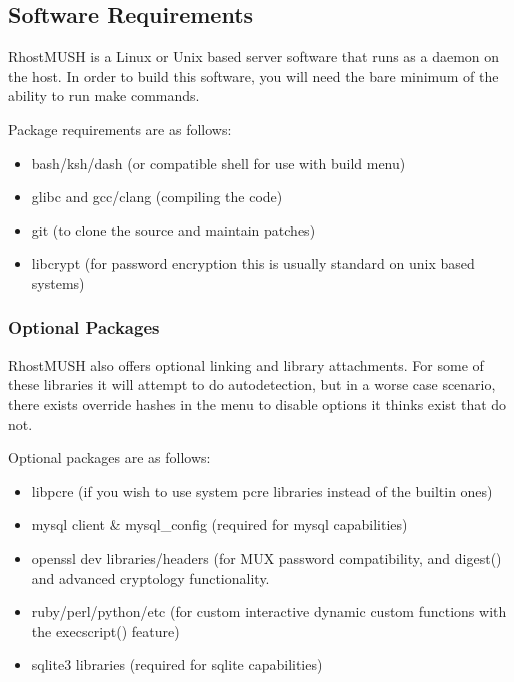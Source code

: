 \documentclass[letterpaper,10pt,english]{sphinxmanual}
\begin{document}
\subsection{Software Requirements}
\label{\detokenize{install:software-requirements}}\label{\detokenize{install:id4}}
\sphinxAtStartPar
RhostMUSH is a Linux or Unix based server software that runs as a daemon on the host.
In order to build this software, you will need the bare minimum of the ability to run \textquotesingle{}make\textquotesingle{} commands.

\sphinxAtStartPar
Package requirements are as follows:
\begin{itemize}
\item {} 
\sphinxAtStartPar
bash/ksh/dash (or compatible shell \sphinxhyphen{} for use with build menu)

\item {} 
\sphinxAtStartPar
glibc and gcc/clang (compiling the code)

\item {} 
\sphinxAtStartPar
git (to clone the source and maintain patches)

\item {} 
\sphinxAtStartPar
libcrypt (for password encryption \sphinxhyphen{} this is usually standard on unix based systems)

\end{itemize}


\subsubsection{Optional Packages}
\label{\detokenize{install:optional-packages}}
\sphinxAtStartPar
RhostMUSH also offers optional linking and library attachments.
For some of these libraries it will attempt to do auto\sphinxhyphen{}detection,
but in a worse case scenario, there exists override hashes in the menu to disable options it thinks exist that do not.

\sphinxAtStartPar
Optional packages are as follows:
\begin{itemize}
\item {} 
\sphinxAtStartPar
libpcre (if you wish to use system pcre libraries instead of the built\sphinxhyphen{}in ones)

\item {} 
\sphinxAtStartPar
mysql client \& mysql\_config (required for mysql capabilities)

\item {} 
\sphinxAtStartPar
openssl dev libraries/headers (for MUX password compatibility, and digest() and advanced cryptology functionality.

\item {} 
\sphinxAtStartPar
ruby/perl/python/etc (for custom interactive dynamic custom functions with the execscript() feature)

\item {} 
\sphinxAtStartPar
sqlite3 libraries (required for sqlite capabilities)

\end{itemize}
\end{document}
